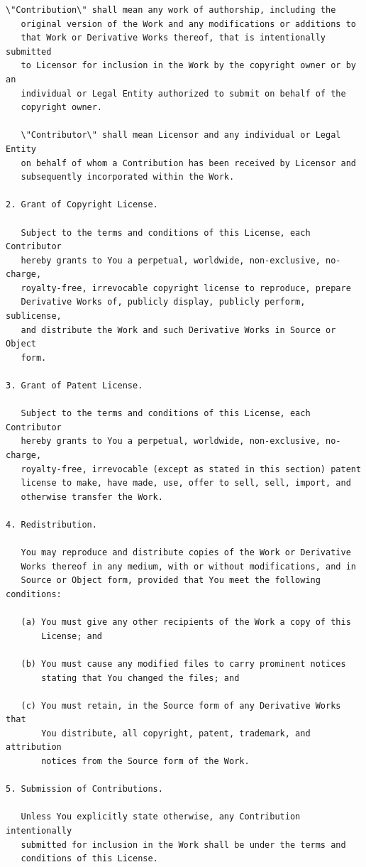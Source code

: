 \documentclass[12pt,a4paper]{article}
\begin{document}
\begin{lstlisting}[style=isabellegray]
   \"Contribution\" shall mean any work of authorship, including the
   original version of the Work and any modifications or additions to
   that Work or Derivative Works thereof, that is intentionally submitted
   to Licensor for inclusion in the Work by the copyright owner or by an
   individual or Legal Entity authorized to submit on behalf of the
   copyright owner.

   \"Contributor\" shall mean Licensor and any individual or Legal Entity
   on behalf of whom a Contribution has been received by Licensor and
   subsequently incorporated within the Work.

2. Grant of Copyright License.

   Subject to the terms and conditions of this License, each Contributor
   hereby grants to You a perpetual, worldwide, non-exclusive, no-charge,
   royalty-free, irrevocable copyright license to reproduce, prepare
   Derivative Works of, publicly display, publicly perform, sublicense,
   and distribute the Work and such Derivative Works in Source or Object
   form.

3. Grant of Patent License.

   Subject to the terms and conditions of this License, each Contributor
   hereby grants to You a perpetual, worldwide, non-exclusive, no-charge,
   royalty-free, irrevocable (except as stated in this section) patent
   license to make, have made, use, offer to sell, sell, import, and
   otherwise transfer the Work.

4. Redistribution.

   You may reproduce and distribute copies of the Work or Derivative
   Works thereof in any medium, with or without modifications, and in
   Source or Object form, provided that You meet the following conditions:

   (a) You must give any other recipients of the Work a copy of this
       License; and

   (b) You must cause any modified files to carry prominent notices
       stating that You changed the files; and

   (c) You must retain, in the Source form of any Derivative Works that
       You distribute, all copyright, patent, trademark, and attribution
       notices from the Source form of the Work.

5. Submission of Contributions.

   Unless You explicitly state otherwise, any Contribution intentionally
   submitted for inclusion in the Work shall be under the terms and
   conditions of this License.


\end{lstlisting}
\end{document}
